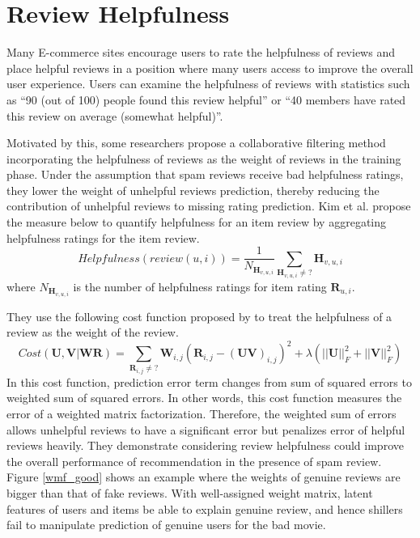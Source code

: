 \documentclass[master,english,final]{kaist-ucs}
\begin{document}
\section{Review Helpfulness}
Many E-commerce sites encourage users to rate the helpfulness of reviews and place helpful reviews in a position where many users access to improve the overall user experience.
Users can examine the helpfulness of reviews with statistics such as “90 (out of 100) people found this review helpful” or “40 members have rated this review on average (somewhat helpful)”.

Motivated by this, some researchers \cite{RQMF} propose a collaborative filtering method incorporating the helpfulness of reviews as the weight of reviews in the training phase.
Under the assumption that spam reviews receive bad helpfulness ratings, they lower the weight of unhelpful reviews prediction, thereby reducing the contribution of unhelpful reviews to missing rating prediction.
Kim et al. \cite{naive_helpfulness} propose the measure below to quantify helpfulness for an item review by aggregating helpfulness ratings for the item review.
\begin{equation}
Helpfulness(review (u,i))=\frac{1} {N_{\bm{H}_{v,u,i}}} \sum_{\bm{H}_{v,u,i} \neq ?} \bm{H}_{v,u,i}
\end{equation}
where $N_{\bm{H}_{v,u,i}}$ is the number of helpfulness ratings for item rating $\bm{R}_{u,i}$.

They use the following cost function proposed by \cite{ImplicitCF} to treat the helpfulness of a review as the weight of the review.
\begin{equation}
Cost(\bm{U},\bm{V} | \bm{W} \bm{R})=\sum_{\bm{R}_{i,j} \neq ?} \bm{W}_{i,j}(  \bm{R}_{i,j} - (\bm{UV})_{i,j} )^2 + \lambda(||\bm{U}||_F^2+||\bm{V}||_F^2)
\end{equation}
In this cost function, prediction error term changes from sum of squared errors to weighted sum of squared errors.
In other words, this cost function measures the error of a weighted matrix factorization.
Therefore, the weighted sum of errors allows unhelpful reviews to have a significant error but penalizes error of helpful reviews heavily.
They demonstrate considering review helpfulness could improve the overall performance of recommendation in the presence of spam review.
Figure \ref{wmf_good} shows an example where the weights of genuine reviews are bigger than that of fake reviews.
With well-assigned weight matrix, latent features of users and items be able to explain genuine review, and hence shillers fail to manipulate prediction of genuine users for the bad movie.
\end{document}
